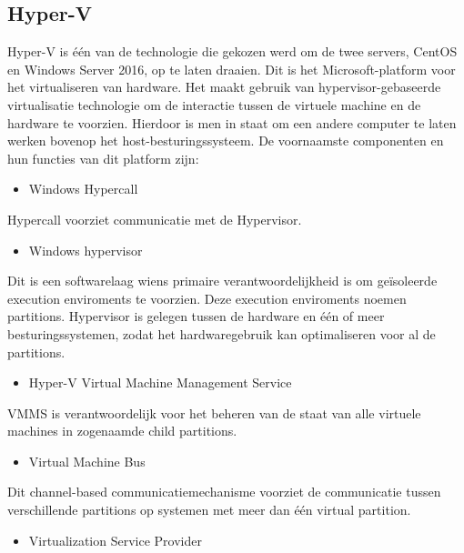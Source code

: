 \subsection{Hyper-V}
Hyper-V is één van de technologie die gekozen werd om de twee servers, CentOS en Windows Server 2016, op te laten draaien. Dit is het Microsoft-platform voor het virtualiseren van hardware. Het maakt gebruik van hypervisor-gebaseerde virtualisatie technologie om de interactie tussen de virtuele machine en de hardware te voorzien. Hierdoor is men in staat om een andere computer te laten werken bovenop het host-besturingssysteem. De voornaamste componenten en hun functies van dit platform zijn:

\begin{itemize}[noitemsep]
	\item Windows Hypercall
\end{itemize}

Hypercall voorziet communicatie met de Hypervisor.

\begin{itemize}[noitemsep]
	\item Windows hypervisor
\end{itemize}

Dit is een softwarelaag wiens primaire verantwoordelijkheid is om geïsoleerde execution enviroments te voorzien. Deze execution enviroments noemen partitions. Hypervisor is gelegen tussen de hardware en één of meer besturingssystemen, zodat het hardwaregebruik kan optimaliseren voor al de partitions.

\begin{itemize}[noitemsep]
	\item Hyper-V Virtual Machine Management Service
\end{itemize}

VMMS is verantwoordelijk voor het beheren van de staat van alle virtuele machines in zogenaamde child partitions.

\begin{itemize}[noitemsep]
	\item Virtual Machine Bus
\end{itemize}

Dit channel-based communicatiemechanisme voorziet de communicatie tussen verschillende partitions op systemen met meer dan één virtual partition.

\begin{itemize}[noitemsep]
	\item Virtualization Service Provider
\end{itemize}

